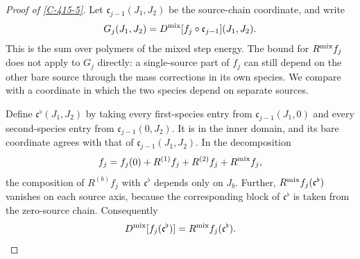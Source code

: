 \documentclass[11pt,letterpaper,reqno]{amsart}
\theoremstyle{definition}
\theoremstyle{remark}
\begin{document}
\begin{proof}[Proof of \cref{C-415-5}]
Let $\mathfrak c_{j-1}(J_1,J_2)$ be the source-chain
coordinate, and write
\[
 G_j(J_1,J_2)
   =D^{\rm mix}[f_j\circ\mathfrak c_{j-1}](J_1,J_2).
\]
This is the sum over polymers of the mixed step energy.
The bound for $R^{\rm mix}f_j$ does not apply to $G_j$
directly: a single-source part of $f_j$ can still depend
on the other bare source through the mass corrections
in its own species.  We compare with a coordinate in
which the two species depend on separate sources.

Define $\mathfrak c^\flat(J_1,J_2)$ by taking every
first-species entry from $\mathfrak c_{j-1}(J_1,0)$
and every second-species entry from
$\mathfrak c_{j-1}(0,J_2)$.  It is in the inner domain,
and its bare coordinate agrees with that of
$\mathfrak c_{j-1}(J_1,J_2)$.  In the decomposition
\[
 f_j=f_j(0)+R^{(1)}f_j+R^{(2)}f_j+R^{\rm mix}f_j,
\]
the composition of $R^{(b)}f_j$ with $\mathfrak c^\flat$
depends only on $J_b$.  Further,
$R^{\rm mix}f_j(\mathfrak c^\flat)$ vanishes on each
source axis, because the corresponding block of
$\mathfrak c^\flat$ is taken from the zero-source chain.
Consequently
\[
 D^{\rm mix}[f_j(\mathfrak c^\flat)]
            =R^{\rm mix}f_j(\mathfrak c^\flat).
\]


\end{proof}
\end{document}
